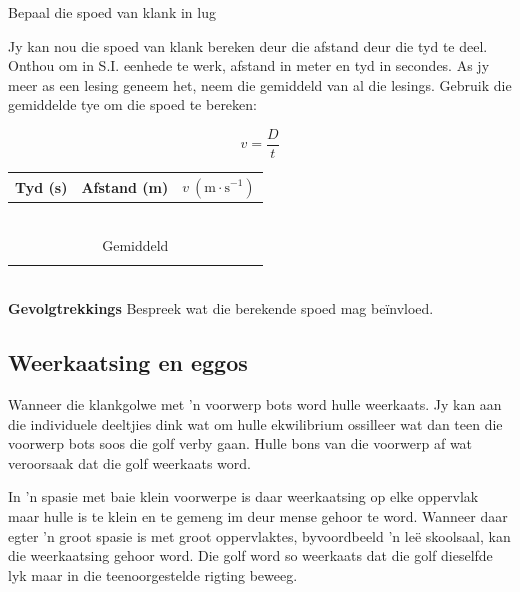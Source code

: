 \begin{i_experiment}{Bepaal die spoed van klank in lug}
\begin{minipage}{.45\textwidth}
Jy kan nou die spoed van klank bereken deur die afstand deur die tyd te deel. Onthou om in S.I. eenhede te werk, afstand in meter en tyd in secondes. As jy meer as een lesing geneem het, neem die gemiddeld van al die lesings. Gebruik die gemiddelde tye om die spoed te bereken: 

\begin{equation*}
 v = \frac{D}{t}
\end{equation*}
\end{minipage}\hspace{.03\textwidth}
\begin{minipage}{.5\textwidth}
\begin{table}[H]
 \begin{tabular}{|c|c|c|}\hline\hline
Tyd (s) & Afstand (m) & $v~(\text{m}\cdot\text{s}^{-1})$ \\\hline
 & & \\\hline 
 & & \\\hline 
 & & \\\hline 
 & & \\\hline 
 & & \\\hline 
 & & \\\hline \hline
\multicolumn{3}{|c|}{Gemiddeld} \\ \hline
 & & \\\hline 
 \end{tabular}
\end{table}
\end{minipage}\\
\textbf{Gevolgtrekkings}
Bespreek wat die berekende spoed mag be\"{i}nvloed.
\end{i_experiment}

\subsection{Weerkaatsing en eggos}

Wanneer die klankgolwe met 'n voorwerp bots word hulle weerkaats. Jy kan aan die individuele deeltjies dink wat om hulle ekwilibrium ossilleer wat dan teen die voorwerp bots soos die golf verby gaan. Hulle bons van die voorwerp af wat veroorsaak dat die golf weerkaats word.

In 'n spasie met baie klein voorwerpe is daar weerkaatsing op elke oppervlak maar hulle is te klein en te gemeng im deur mense gehoor te word. Wanneer daar egter 'n groot spasie is met groot oppervlaktes, byvoordbeeld 'n le\"e skoolsaal, kan die weerkaatsing gehoor word. Die golf word so weerkaats dat die golf dieselfde lyk maar in die teenoorgestelde rigting beweeg.

